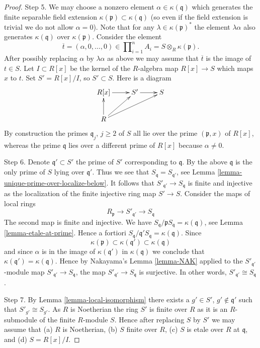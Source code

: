 \begin{proof}
\medskip\noindent
Step 5. We may choose a nonzero element $\alpha \in \kappa(\mathfrak q)$ which
generates the finite separable field extension
$\kappa(\mathfrak p) \subset \kappa(\mathfrak q)$ (so even if the
field extension is trivial we do not allow $\alpha = 0$).
Note that for any $\lambda \in \kappa(\mathfrak p)^*$ the
element $\lambda \alpha$ also generates $\kappa(\mathfrak q)$
over $\kappa(\mathfrak p)$. Consider the element
$$
\overline{t} =
(\alpha, 0, \ldots, 0) \in
\prod\nolimits_{i = 1}^n A_i =
S \otimes_R \kappa(\mathfrak p).
$$
After possibly replacing $\alpha$ by $\lambda \alpha$ as above
we may assume that $\overline{t}$ is the image of $t \in S$.
Let $I \subset R[x]$ be the kernel of the $R$-algebra
map $R[x] \to S$ which maps $x$ to $t$. Set $S' = R[x]/I$,
so $S' \subset S$. Here is a diagram
$$
\xymatrix{
R[x] \ar[r] & S' \ar[r] & S \\
R \ar[u] \ar[ru] \ar[rru] & &
}
$$
By construction the primes $\mathfrak q_j$, $j \geq 2$ of $S$ all
lie over the prime $(\mathfrak p, x)$ of $R[x]$, whereas
the prime $\mathfrak q$ lies over a different prime of $R[x]$
because $\alpha \not = 0$.

\medskip\noindent
Step 6. Denote $\mathfrak q' \subset S'$ the prime of $S'$
corresponding to $\mathfrak q$. By the above $\mathfrak q$ is
the only prime of $S$ lying over $\mathfrak q'$. Thus we see that
$S_{\mathfrak q} = S_{\mathfrak q'}$, see
Lemma \ref{lemma-unique-prime-over-localize-below}. It follows that
$S'_{\mathfrak q'} \to S_{\mathfrak q}$ is finite and injective
as the localization of the finite injective ring map $S' \to S$.
Consider the maps of local rings
$$
R_{\mathfrak p} \to S'_{\mathfrak q'} \to S_{\mathfrak q}
$$
The second map is finite and injective. We have
$S_{\mathfrak q}/\mathfrak pS_{\mathfrak q} = \kappa(\mathfrak q)$,
see Lemma \ref{lemma-etale-at-prime}.
Hence a fortiori
$S_{\mathfrak q}/\mathfrak q'S_{\mathfrak q} = \kappa(\mathfrak q)$.
Since
$$
\kappa(\mathfrak p) \subset \kappa(\mathfrak q') \subset \kappa(\mathfrak q)
$$
and since $\alpha$ is in the image of $\kappa(\mathfrak q')$ in
$\kappa(\mathfrak q)$
we conclude that $\kappa(\mathfrak q') = \kappa(\mathfrak q)$.
Hence by Nakayama's Lemma \ref{lemma-NAK} applied to the
$S'_{\mathfrak q'}$-module map $S'_{\mathfrak q'} \to S_{\mathfrak q}$,
the map $S'_{\mathfrak q'} \to S_{\mathfrak q}$ is surjective.
In other words,
$S'_{\mathfrak q'} \cong S_{\mathfrak q}$.

\medskip\noindent
Step 7. By Lemma \ref{lemma-local-isomorphism} there exists a $g' \in S'$,
$g' \not \in \mathfrak q'$ such that $S'_{g'} \cong S_{g'}$.
As $R$ is Noetherian the ring $S'$ is finite over $R$ as it is an $R$-submodule
of the finite $R$-module $S$. Hence after replacing $S$ by $S'$ we may
assume that (a) $R$ is Noetherian, (b) $S$ finite over $R$, (c)
$S$ is etale over $R$ at $\mathfrak q$, and (d) $S = R[x]/I$.


\end{proof}
